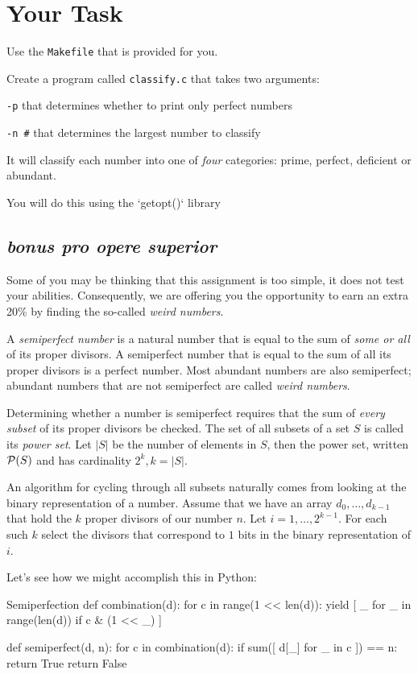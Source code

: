 \section{Your Task}
Use the \texttt{Makefile} that is provided for you.

Create a program called \texttt{classify.c} that takes two arguments:

\texttt{-p} that determines whether to print only perfect numbers

\texttt{-n \#} that determines the largest number to classify

It will classify each number into one of \emph{four} categories: prime, perfect, deficient or abundant.

You will do this using the `getopt()` library

\subsection{\em bonus pro opere superior}

Some of you may be thinking that this assignment is too simple, it
does not test your abilities. Consequently, we are offering you the
opportunity to earn  an extra 20\% by finding the so-called
\emph{weird numbers}.

A \emph{semiperfect number} is
a natural number that is equal to the sum of \emph{some or all} of its
proper divisors. A semiperfect number that is equal to the sum of
all its proper divisors is a perfect number.  Most abundant numbers
are also semiperfect; abundant numbers that are not semiperfect are
called \emph{weird numbers}.

Determining whether a number is semiperfect requires that the sum
of \emph{every subset} of its proper divisors be checked. The set
of all subsets of a set $S$ is called its \emph{power set}.
Let $|S|$ be the number of elements in $S$, then the power set, written
${\cal P} (S)$ and has cardinality $2^k, k = |S|$.

An algorithm for cycling through all subsets naturally comes from
looking at the binary representation of a number. Assume that we
have an array $d_0, \ldots, d_{k-1}$ that hold the $k$ proper
divisors of our number $n$. Let $i = 1, \ldots, 2^{k-1}$. For each
such $k$ select the divisors that correspond to $1$ bits in the
binary representation of $i$.

Let's see how we might accomplish this in Python:

\begin{pylisting}{Semiperfection}
def combination(d):
    for c in range(1 << len(d)):
        yield [ _ for _ in range(len(d)) if c & (1 << _) ]

def semiperfect(d, n):
    for c in combination(d):
        if sum([ d[_] for _ in c ]) == n:
            return True
    return False
\end{pylisting}

